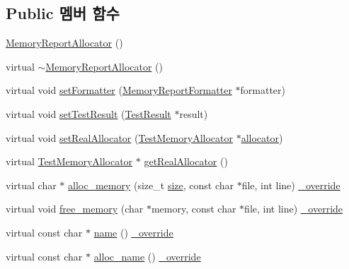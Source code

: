 \subsection*{Public 멤버 함수}
\begin{DoxyCompactItemize}
\item 
\hyperlink{class_memory_report_allocator_ab084f90daa56ba2012181189ef4832e9}{Memory\+Report\+Allocator} ()
\item 
virtual \hyperlink{class_memory_report_allocator_aa12dedd8bd5d3d262b9a6cd1c9951943}{$\sim$\+Memory\+Report\+Allocator} ()
\item 
virtual void \hyperlink{class_memory_report_allocator_ad37a1a2f2f4b9b3bc727787419603822}{set\+Formatter} (\hyperlink{class_memory_report_formatter}{Memory\+Report\+Formatter} $\ast$formatter)
\item 
virtual void \hyperlink{class_memory_report_allocator_acaf37f2a99edd0cc27d26e030cfc0350}{set\+Test\+Result} (\hyperlink{class_test_result}{Test\+Result} $\ast$result)
\item 
virtual void \hyperlink{class_memory_report_allocator_a737067a84ae7d257b322e2623c977367}{set\+Real\+Allocator} (\hyperlink{class_test_memory_allocator}{Test\+Memory\+Allocator} $\ast$\hyperlink{_memory_leak_warning_test_8cpp_a83fc2e9b9142613f7df2bcc3ff8292bc}{allocator})
\item 
virtual \hyperlink{class_test_memory_allocator}{Test\+Memory\+Allocator} $\ast$ \hyperlink{class_memory_report_allocator_a18a227d75379af0777357a7a9299e7a5}{get\+Real\+Allocator} ()
\item 
virtual char $\ast$ \hyperlink{class_memory_report_allocator_a126f004b0a561fbedbba12273cfbbd61}{alloc\+\_\+memory} (size\+\_\+t \hyperlink{gst__avb__playbin_8c_a439227feff9d7f55384e8780cfc2eb82}{size}, const char $\ast$file, int line) \hyperlink{_cpp_u_test_config_8h_a049bea15dd750e15869863c94c1efc3b}{\+\_\+override}
\item 
virtual void \hyperlink{class_memory_report_allocator_a7c662c2adde1ec0a375b14c0d106b6d5}{free\+\_\+memory} (char $\ast$memory, const char $\ast$file, int line) \hyperlink{_cpp_u_test_config_8h_a049bea15dd750e15869863c94c1efc3b}{\+\_\+override}
\item 
virtual const char $\ast$ \hyperlink{class_memory_report_allocator_a90b3e100eca6e28565e6447326b1f7b0}{name} () \hyperlink{_cpp_u_test_config_8h_a049bea15dd750e15869863c94c1efc3b}{\+\_\+override}
\item 
virtual const char $\ast$ \hyperlink{class_memory_report_allocator_a62de9a48894a6e9b1381a3fbbb8fdca9}{alloc\+\_\+name} () \hyperlink{_cpp_u_test_config_8h_a049bea15dd750e15869863c94c1efc3b}{\+\_\+override}

\end{DoxyCompactItemize}
